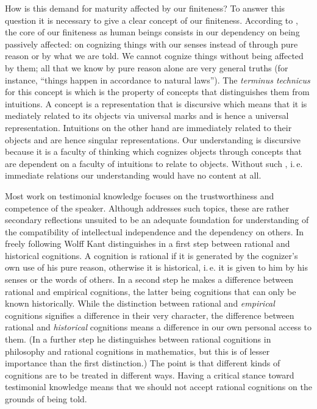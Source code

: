 How is this demand for maturity affected by our finiteness? To answer this
question it is necessary to give a clear concept of our finiteness. According to
, the core of our finiteness as human beings  consists in
our dependency on being passively affected: on cognizing things with our senses
instead of through pure reason or by what we are told. We cannot cognize things
without being affected by them; all that we know by pure reason alone are very
general truths (for instance,  \enquote{things happen in accordance to natural
laws}). The \emph{terminus technicus} for this concept is
 which is the property of
concepts that distinguishes them from intuitions. A concept is a representation
that is discursive which means that it is mediately related to its objects via
universal marks and is hence a universal representation. Intuitions on the other
hand are immediately related to their objects and are hence singular
representations. Our understanding is discursive because it is a faculty of
thinking which cognizes objects through concepts that are dependent on a
faculty of intuitions to relate to objects. Without such
, i.\,e. immediate relations our understanding would have
no content at all.

Most work on testimonial knowledge focuses on the trustworthiness and competence
of the speaker. Although  addresses such topics,
these are rather secondary reflections unsuited to be an adequate foundation for
understanding of the compatibility of intellectual independence and the
dependency on others. In freely following Wolff Kant distinguishes in a first
step between rational and historical cognitions. A cognition is rational if it
is generated by the cognizer's own use of his pure reason, otherwise it is
historical, i.\,e.
it is given to him by his senses or the words of others. In a second step he
makes a difference between rational and empirical cognitions, the latter being
cognitions that can only be known historically. While the distinction between
rational and \emph{empirical} cognitions signifies a difference in their very
character, the difference between rational and \emph{historical}
cognitions means a difference in our own personal access to them. (In a
further step he distinguishes between  rational
cognitions in philosophy and  rational cognitions in
mathematics, but this is of lesser importance than the first distinction.) The
point is that different kinds of cognitions are to be treated in different ways.
Having a critical stance toward testimonial knowledge means that we should not accept
rational cognitions on the grounds of being told.

